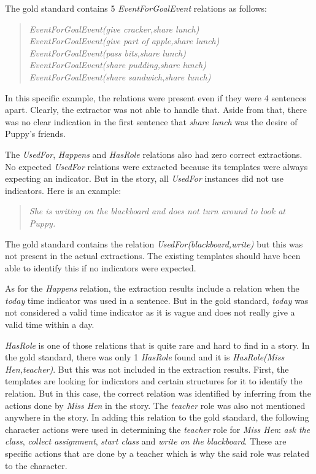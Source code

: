 The gold standard contains 5 \textit{EventForGoalEvent} relations as follows:

\begin{verse}
\itshape
EventForGoalEvent(give cracker,share lunch)\\
EventForGoalEvent(give part of apple,share lunch)\\
EventForGoalEvent(pass bits,share lunch)\\
EventForGoalEvent(share pudding,share lunch)\\
EventForGoalEvent(share sandwich,share lunch)\\
\end{verse}

In this specific example, the relations were present even if they were 4 sentences apart. Clearly, the extractor was not able to handle that. Aside from that, there was no clear indication in the first sentence that \textit{share lunch} was the desire of Puppy's friends. 

The \textit{UsedFor}, \textit{Happens} and \textit{HasRole} relations also had zero correct extractions. No expected \textit{UsedFor} relations were extracted because its templates were always expecting an indicator. But in the story, all \textit{UsedFor} instances did not use indicators. Here is an example:

\begin{verse}
\itshape
She is writing on the blackboard and does not turn around to look at Puppy.
\end{verse}

The gold standard contains the relation \textit{UsedFor(blackboard,write)} but this was not present in the actual extractions. The existing  templates should have been able to identify this if no indicators were expected.

As for the \textit{Happens} relation, the extraction results include a relation when the \textit{today} time indicator was used in a sentence. But in the gold standard, \textit{today} was not considered a valid time indicator as it is vague and does not really give a valid time within a day.

\textit{HasRole} is one of those relations that is quite rare and hard to find in a story. In the gold standard, there was only 1 \textit{HasRole} found and it is \textit{HasRole(Miss Hen,teacher)}. But this was not included in the extraction results. First, the templates are looking for indicators and certain structures for it to identify the relation. But in this case, the correct relation was identified by inferring from the actions done by \textit{Miss Hen} in the story. The \textit{teacher} role was also not mentioned anywhere in the story. In adding this relation to the gold standard, the following character actions were used in determining the \textit{teacher} role for \textit{Miss Hen}: \textit{ask the class}, \textit{collect assignment}, \textit{start class} and \textit{write on the blackboard}. These are specific actions that are done by a teacher which is why the said role was related to the character.

